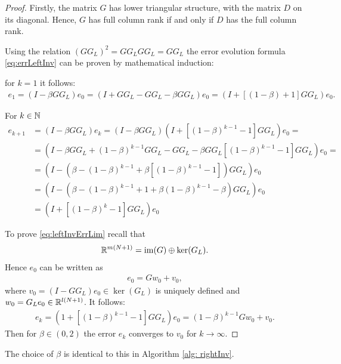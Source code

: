 \begin{proof}
	Firstly, the matrix $G$ has lower triangular structure, with the matrix $D$ on its diagonal. Hence, $G$ has full column rank if and only if $D$ has the full column rank.
	
	Using the relation $(GG_L)^2 = GG_LGG_L = GG_L$ the error evolution formula \eqref{eq:errLeftInv} can be proven by mathematical induction: 
	
	for $k = 1$ it follows: 
	\begin{align*}
	e_1 = (I - \beta G G_L)e_0 = (I + GG_L - GG_L - \beta G G_L)e_0 = (I + \left[(1 - \beta) + 1\right]GG_L)e_0.
	\end{align*}
	
	For $k \in {\mathbb{N}}$  
	\begin{align*}
	e_{k+1} &= ( I - \beta G G_L)e_k = ( I - \beta G G_L) (I+  \left[(1-\beta)^{k-1} - 1\right] G G_L) e_0 = \\
	& = \left(I - \beta G G_L + (1-\beta)^{k-1}GG_L - GG_L - \beta GG_L\left[(1 - \beta)^{k-1} - 1\right]GG_L\right)e_0=\\
	& = \left(I - (\beta - (1-\beta)^{k-1} + \beta\left[(1 - \beta)^{k-1} - 1\right])G G_L\right)e_0\\
	& = \left(I - \left(\beta - (1-\beta)^{k-1} + 1 + \beta(1-\beta)^{k-1} - \beta\right)GG_L\right)e_0\\
	& = (I+  \left[(1-\beta)^k - 1\right] G G_L) e_0
	\end{align*}
	
	To prove \eqref{eq:leftInvErrLim} recall that 
	\begin{align*}
	{\mathbb{R}}^{m(N+1)} = \operatorname{im}(G)\oplus \ker (G_L). 
	\end{align*}
	Hence $e_0$ can be written as 
	\begin{align*}
	e_0 = G w_0 + v_0,
	\end{align*}
	where $v_0 = (I - G G_L)e_0 \in \ker (G_L)$  is uniquely defined and $w_0 = G_L e_0 \in {\mathbb{R}}^{l(N+1)}$. It follows: 
	\begin{align*}
	e_{k} = (1+ \left[(1 - \beta)^{k-1} - 1\right]GG_L)e_0 = (1-\beta)^{k-1} G w_0 + v_0.
	\end{align*}
	Then for $\beta \in (0,2)$ the error $e_k$ converges to $v_0$ for $k \to \infty$. 
\end{proof} 



The choice of $\beta$ is identical to this in Algorithm \ref{alg: rightInv}.

